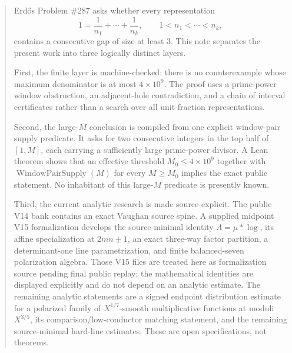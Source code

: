\documentclass[11pt]{article}
\theoremstyle{definition}
\newcommand{\1}{\mathbf 1}
\newcommand{\WPS}{\operatorname{WindowPairSupply}}
\begin{document}
\begin{abstract}
Erd\H{o}s Problem \#287 asks whether every representation
\[
1=\frac1{n_1}+\cdots+\frac1{n_k},\qquad 1<n_1<\cdots<n_k,
\]
contains a consecutive gap of size at least $3$.  This note separates the present work into
three logically distinct layers.

First, the finite layer is machine-checked: there is no counterexample whose maximum
denominator is at most $4\times10^9$.  The proof uses a prime-power window obstruction,
an adjacent-hole contradiction, and a chain of interval certificates rather than a search
over all unit-fraction representations.

Second, the large-$M$ conclusion is compiled from one explicit window-pair supply predicate.  It asks for two consecutive integers in the top half of $[1,M]$, each carrying
a sufficiently large prime-power divisor.  A Lean theorem shows that an effective threshold
$M_0\le4\times10^9$ together with $\WPS(M)$ for every $M\ge M_0$ implies the exact public
statement.  No inhabitant of this large-$M$ predicate is presently known.

Third, the current analytic research is made source-explicit.  The public V14 bank
contains an exact Vaughan source spine.  A supplied midpoint V15 formalization develops the
source-minimal identity $\Lambda=\mu*\log$, its affine specialization at $2mn\pm1$, an
exact three-way factor partition, a determinant-one line parametrization, and finite
balanced-seven polarization algebra.  Those V15 files are treated here as formalization
source pending final public replay; the mathematical identities are displayed explicitly
and do not depend on an analytic estimate.  The remaining analytic statements are a signed
endpoint distribution estimate for a polarized family of $X^{1/7}$-smooth multiplicative
functions at moduli $X^{3/5}$, its comparison/low-conductor matching statement, and the
remaining source-minimal hard-line estimates.  These are open specifications, not theorems.
\end{abstract}
\end{document}
